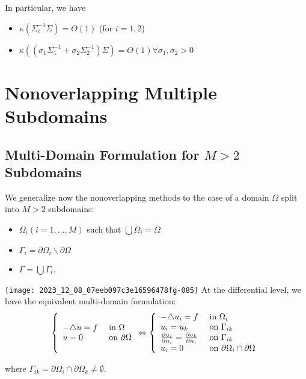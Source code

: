 \documentclass[11pt]{book}
\begin{document}
In particular, we have

\begin{itemize}
\item $\kappa\left(\Sigma_i^{-1} \Sigma\right)=O(1)$ (for $i=1,2$)
\item $\kappa\left(\left(\sigma_1 \Sigma_1^{-1}+\sigma_2 \Sigma_2^{-1}\right) \Sigma\right)=O(1) \forall \sigma_1, \sigma_2>0$
\end{itemize}


\section{Nonoverlapping Multiple Subdomains}
\subsection*{Multi-Domain Formulation for $M>2$ Subdomains}
We generalize now the nonoverlapping methods to the case of a domain $\Omega$ split into $M>2$ subdomains:

\begin{itemize}
  \item $\Omega_{i}(i=1, \ldots, M)$ such that $\bigcup \bar{\Omega}_{i}=\bar{\Omega}$
  \item $\Gamma_{i}=\partial \Omega_{i} \backslash \partial \Omega$
  \item $\Gamma=\bigcup \Gamma_{i}$.
\end{itemize}
\texttt{[image: 2023\_12\_08\_07eeb097c3e16596478fg-085]}
At the differential level, we have the equivalent multi-domain formulation:
$$
\left\{\begin{array} { l l } 
{ - \triangle u = f } & { \text { in } \Omega } \\
{ u = 0 } & { \text { on } \partial \Omega }
\end{array} \Leftrightarrow \left\{\begin{array}{ll}
-\triangle u_{i}=f & \text { in } \Omega_{i} \\
u_{i}=u_{k} & \text { on } \Gamma_{i k} \\
\frac{\partial u_{i}}{\partial n_{i}}=\frac{\partial u_{k}}{\partial n_{i}} & \text { on } \Gamma_{i k} \\
u_{i}=0 & \text { on } \partial \Omega_{i} \cap \partial \Omega
\end{array}\right.\right.
$$

where $\Gamma_{i k}=\partial \Omega_{i} \cap \partial \Omega_{k} \neq \emptyset$.
\end{document}
